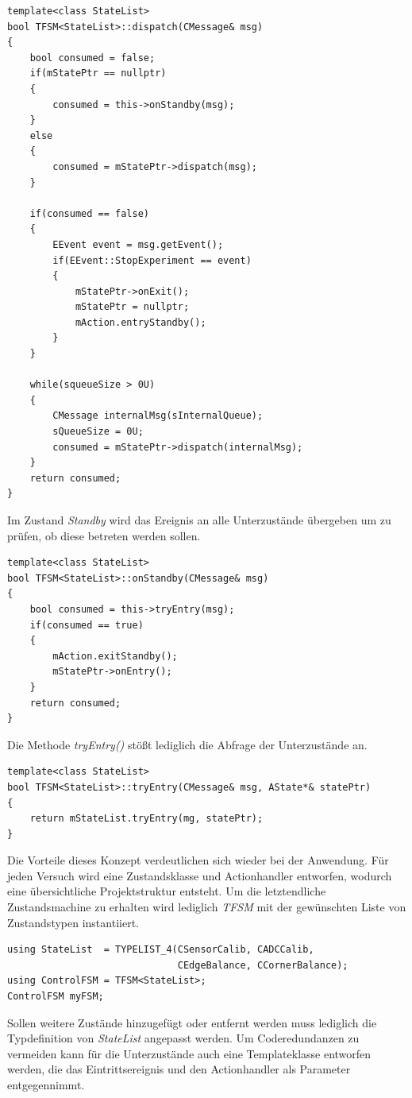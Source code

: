 \begin{lstlisting}[caption={Definition der Methode \textit{dispatch()}},captionpos=b]
template<class StateList>
bool TFSM<StateList>::dispatch(CMessage& msg)
{
	bool consumed = false;
	if(mStatePtr == nullptr)
	{
		consumed = this->onStandby(msg);
	}
	else
	{
		consumed = mStatePtr->dispatch(msg);
	}
	
	if(consumed == false)
	{
		EEvent event = msg.getEvent();
		if(EEvent::StopExperiment == event)
		{
			mStatePtr->onExit();
			mStatePtr = nullptr;
			mAction.entryStandby();
		}
	}
	
	while(squeueSize > 0U)
	{
		CMessage internalMsg(sInternalQueue);
		sQueueSize = 0U;
		consumed = mStatePtr->dispatch(internalMsg);
	}
	return consumed;
}
\end{lstlisting}
Im Zustand \textit{Standby} wird das Ereignis an alle Unterzustände übergeben um zu prüfen, ob diese betreten werden sollen. 
\begin{lstlisting}[caption={Implementierung der Methode \textit{onStandby()}},captionpos=b]
template<class StateList>
bool TFSM<StateList>::onStandby(CMessage& msg)
{
	bool consumed = this->tryEntry(msg);
	if(consumed == true)
	{
		mAction.exitStandby();
		mStatePtr->onEntry();
	}
	return consumed;
}
\end{lstlisting}
Die Methode \textit{tryEntry()} stößt lediglich die Abfrage der Unterzustände an.
\begin{lstlisting}[caption={Implementierung der Methode \textit{tryEntry()}},captionpos=b]
template<class StateList>
bool TFSM<StateList>::tryEntry(CMessage& msg, AState*& statePtr)
{
	return mStateList.tryEntry(mg, statePtr);
}
\end{lstlisting}
Die Vorteile dieses Konzept verdeutlichen sich wieder bei der Anwendung. Für jeden Versuch wird eine Zustandsklasse und Actionhandler entworfen, wodurch eine übersichtliche Projektstruktur entsteht. Um die letztendliche Zustandsmachine zu erhalten wird lediglich \textit{TFSM} mit der gewünschten Liste von Zustandstypen instantiiert.
\begin{lstlisting}[caption={Beispielhafte Instantiierung der Zustandsmaschine},captionpos=b]
using StateList  = TYPELIST_4(CSensorCalib, CADCCalib, 
                              CEdgeBalance, CCornerBalance);
using ControlFSM = TFSM<StateList>;
ControlFSM myFSM;
\end{lstlisting}
Sollen weitere Zustände hinzugefügt oder entfernt werden muss lediglich die Typdefinition von \textit{StateList} angepasst werden. Um Coderedundanzen zu vermeiden kann für die Unterzustände auch eine Templateklasse entworfen werden, die das Eintrittsereignis und den Actionhandler als Parameter entgegennimmt. 

